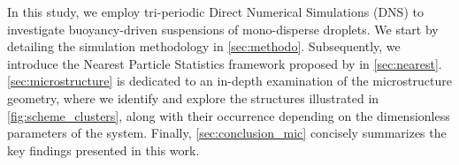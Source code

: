 
In this study, we employ tri-periodic Direct Numerical Simulations (DNS) to investigate buoyancy-driven suspensions of mono-disperse droplets. 
We start by detailing the simulation methodology in \ref{sec:methodo}. 
Subsequently, we introduce the Nearest Particle Statistics framework proposed by \citet{zhang2023evolution} in \ref{sec:nearest}. \ref{sec:microstructure} is dedicated to an in-depth examination of the microstructure geometry, where we identify and explore the structures illustrated in \ref{fig:scheme_clusters}, along with their occurrence depending on the dimensionless parameters of the system. Finally, \ref{sec:conclusion_mic} concisely summarizes the key findings presented in this work.

